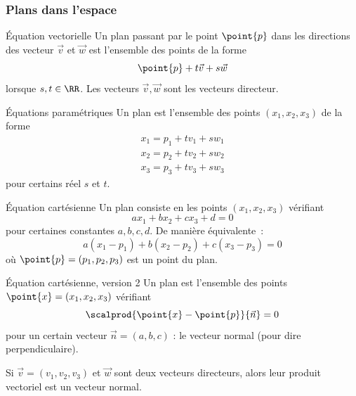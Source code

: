 \subsubsection{Plans dans l'espace}
\begin{frame}
  \begin{block}{Équation vectorielle}
    Un plan passant par le point \(\point{p}\) dans les directions des vecteur \(\vec{v}\) et \(\vec{w}\) est l'ensemble des points de la forme
    \begin{equation*}
      \point{p} + t \vec{v} + s \vec{w}
    \end{equation*}
    lorsque \(s,t \in \RR\). Les vecteurs \(\vec{v}, \vec{w}\) sont les vecteurs directeur.
  \end{block}\pause
  \begin{block}{Équations paramétriques}
    Un plan est l'ensemble des points \((x_{1},x_{2},x_{3})\) de la forme
    \begin{align*}
      x_{1} = p_1 + t v_1 + s w_1\\
      x_{2} = p_2 + t v_2 + s w_2\\
      x_{3} = p_3 + t v_3 + s w_3
    \end{align*}
    pour certains réel \(s\) et \(t\).
  \end{block}
\end{frame}
\begin{frame}
\begin{block}{Équation cartésienne}
    Un plan consiste en les points \((x_{1},x_{2},x_{3})\) vérifiant
    \begin{equation*}
      a x_{1} + b x_{2} + c x_{3} + d = 0
    \end{equation*}
    pour certaines constantes \(a,b,c,d\). De manière équivalente~:
    \begin{equation*}
      a (x_{1} - p_{1}) + b (x_{2} - p_{2}) + c (x_{3} - p_{3}) = 0
    \end{equation*}
    où \(\point{p} = (p_{1},p_{2},p_{3})\) est un point du plan.
  \end{block}\pause
  \begin{block}{Équation cartésienne, version 2}
    Un plan est l'ensemble des points \(\point{x} = (x_{1},x_{2},x_{3})\) vérifiant
    \begin{equation*}
      \scalprod{\point{x} - \point{p}}{\vec{n}} = 0
    \end{equation*}
    pour un certain vecteur \(\vec{n}= (a,b,c)\) : le vecteur normal (pour dire \og perpendiculaire\fg{}).
  \end{block}\pause
  \begin{proposition}
    Si \(\vec{v} = (v_{1},v_{2},v_{3})\) et \(\vec{w}\) sont deux vecteurs directeurs, alors leur produit vectoriel est un vecteur normal.
  \end{proposition}
\end{frame}
